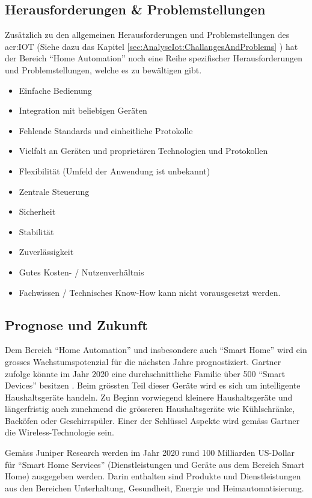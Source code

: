\subsection{Herausforderungen \& Problemstellungen}
Zusätzlich zu den allgemeinen Herausforderungen und Problemstellungen des \gls{acr:IOT} (Siehe dazu das Kapitel \ref{sec:AnalyseIot:ChallangesAndProblems} ) hat der Bereich "`Home Automation"' noch eine Reihe spezifischer Herausforderungen und Problemstellungen, welche es zu bewältigen gibt.

\begin{itemize}
\item Einfache Bedienung
\item Integration mit beliebigen Geräten
\item Fehlende Standards und einheitliche Protokolle
\item Vielfalt an Geräten und proprietären Technologien und Protokollen
\item Flexibilität (Umfeld der Anwendung ist unbekannt)
\item Zentrale Steuerung
\item Sicherheit
\item Stabilität
\item Zuverlässigkeit
\item Gutes Kosten- / Nutzenverhältnis
\item Fachwissen / Technisches Know-How kann nicht vorausgesetzt werden.
\end{itemize}

\subsection{Prognose und Zukunft}
Dem Bereich "`Home Automation"' und insbesondere auch "`Smart Home"' wird ein grosses Wachstumspotenzial für die nächsten Jahre prognostiziert. Gartner zufolge könnte im Jahr 2020 eine durchschnittliche Familie über 500 "`Smart Devices"' besitzen \cite{E:Gartner:Prognose:SmartHome}. Beim grössten Teil dieser Geräte wird es sich um intelligente Haushaltsgeräte handeln. Zu Beginn vorwiegend kleinere Haushaltsgeräte und längerfristig auch zunehmend die grösseren Haushaltsgeräte wie Kühlschränke, Backöfen oder Geschirrspüler. Einer der Schlüssel Aspekte wird gemäss Gartner die Wireless-Technologie sein.

Gemäss Juniper Research werden im Jahr 2020 rund 100 Milliarden US-Dollar für "`Smart Home Services"' (Dienstleistungen und Geräte aus dem Bereich Smart Home) ausgegeben werden. Darin enthalten sind Produkte und Dienstleistungen aus den Bereichen Unterhaltung, Gesundheit, Energie und Heimautomatisierung.

